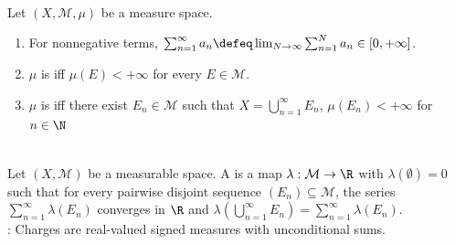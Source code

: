 \begin{definition} \label{def:abstract-measures-finite-sigma-finite} \\
Let $(X,\mathcal{M},\mu)$ be a measure space.
\begin{enumerate}[label=(\roman*)]
\setlength{\itemsep}{0pt}
\item For nonnegative terms, $\sum_{n=1}^{\infty}a_n\defeq\lim_{N\to\infty}\sum_{n=1}^{N}a_n\in[0,+\infty]$.
\item $\mu$ is  iff $\mu(E)<+\infty$ for every $E\in\mathcal{M}$.
\item $\mu$ is  iff there exist $E_n\in\mathcal{M}$ such that $X=\bigcup_{n=1}^{\infty}E_n$, $\mu(E_n)<+\infty$ for $n\in\N$
\end{enumerate}
\end{definition}

\begin{definition} \label{def:charges-finite-signed-measures} \\
Let $(X,\mathcal{M})$ be a measurable space. A  is a map $\lambda:\mathcal{M}\to\R$ with $\lambda(\emptyset)=0$ such that for every pairwise disjoint sequence $(E_n)\subseteq\mathcal{M}$, the series $\sum_{n=1}^{\infty}\lambda(E_n)$ converges in $\R$ and $\lambda(\bigcup_{n=1}^{\infty}E_n)=\sum_{n=1}^{\infty}\lambda(E_n)$.\\
: Charges are real-valued signed measures with unconditional sums.
\end{definition}


